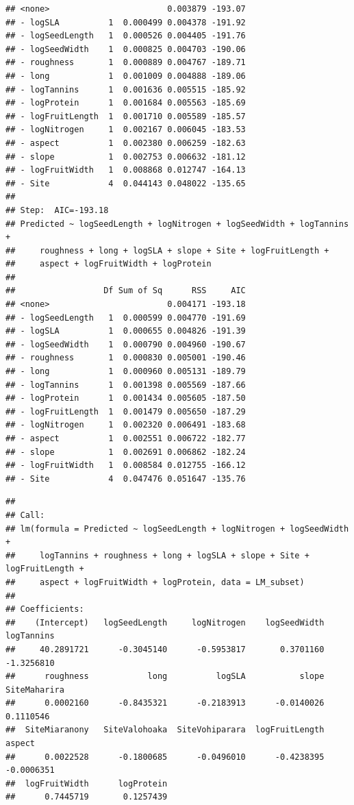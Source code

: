 \documentclass[
  12pt,
]{article}
\begin{document}
\begin{verbatim}
## <none>                        0.003879 -193.07
## - logSLA          1  0.000499 0.004378 -191.92
## - logSeedLength   1  0.000526 0.004405 -191.76
## - logSeedWidth    1  0.000825 0.004703 -190.06
## - roughness       1  0.000889 0.004767 -189.71
## - long            1  0.001009 0.004888 -189.06
## - logTannins      1  0.001636 0.005515 -185.92
## - logProtein      1  0.001684 0.005563 -185.69
## - logFruitLength  1  0.001710 0.005589 -185.57
## - logNitrogen     1  0.002167 0.006045 -183.53
## - aspect          1  0.002380 0.006259 -182.63
## - slope           1  0.002753 0.006632 -181.12
## - logFruitWidth   1  0.008868 0.012747 -164.13
## - Site            4  0.044143 0.048022 -135.65
## 
## Step:  AIC=-193.18
## Predicted ~ logSeedLength + logNitrogen + logSeedWidth + logTannins + 
##     roughness + long + logSLA + slope + Site + logFruitLength + 
##     aspect + logFruitWidth + logProtein
## 
##                  Df Sum of Sq      RSS     AIC
## <none>                        0.004171 -193.18
## - logSeedLength   1  0.000599 0.004770 -191.69
## - logSLA          1  0.000655 0.004826 -191.39
## - logSeedWidth    1  0.000790 0.004960 -190.67
## - roughness       1  0.000830 0.005001 -190.46
## - long            1  0.000960 0.005131 -189.79
## - logTannins      1  0.001398 0.005569 -187.66
## - logProtein      1  0.001434 0.005605 -187.50
## - logFruitLength  1  0.001479 0.005650 -187.29
## - logNitrogen     1  0.002320 0.006491 -183.68
## - aspect          1  0.002551 0.006722 -182.77
## - slope           1  0.002691 0.006862 -182.24
## - logFruitWidth   1  0.008584 0.012755 -166.12
## - Site            4  0.047476 0.051647 -135.76
\end{verbatim}

\begin{verbatim}
## 
## Call:
## lm(formula = Predicted ~ logSeedLength + logNitrogen + logSeedWidth + 
##     logTannins + roughness + long + logSLA + slope + Site + logFruitLength + 
##     aspect + logFruitWidth + logProtein, data = LM_subset)
## 
## Coefficients:
##    (Intercept)   logSeedLength     logNitrogen    logSeedWidth      logTannins  
##     40.2891721      -0.3045140      -0.5953817       0.3701160      -1.3256810  
##      roughness            long          logSLA           slope    SiteMaharira  
##      0.0002160      -0.8435321      -0.2183913      -0.0140026       0.1110546  
##  SiteMiaranony   SiteValohoaka  SiteVohiparara  logFruitLength          aspect  
##      0.0022528      -0.1800685      -0.0496010      -0.4238395      -0.0006351  
##  logFruitWidth      logProtein  
##      0.7445719       0.1257439
\end{verbatim}
\end{document}
